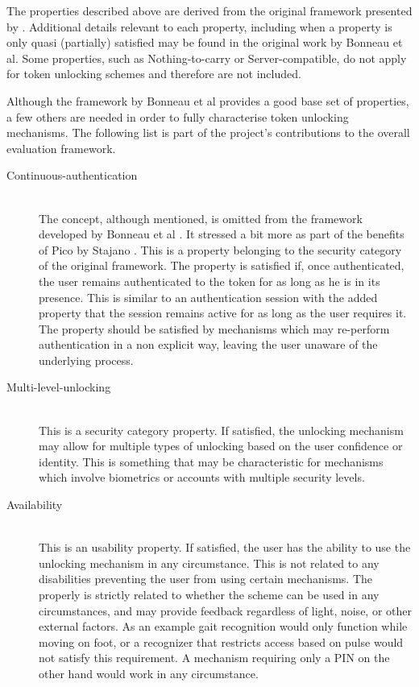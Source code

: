 The properties described above are derived from the original framework presented by \cite{bonneau2012quest}. Additional details relevant to each property, including when a property is only quasi (partially) satisfied may be found in the original work by Bonneau et al. Some properties, such as Nothing-to-carry or Server-compatible, do not apply for token unlocking schemes and therefore are not included.

Although the framework by Bonneau et al provides a good base set of properties, a few others are needed in order to fully characterise token unlocking mechanisms. The following list is part of the project's contributions to the overall evaluation framework.

\begin{description}
  \item[Continuous-authentication] \hfill \\
  The concept, although mentioned, is omitted from the framework developed by Bonneau et al \cite{bonneau2012quest}. It stressed a bit more as part of the benefits of Pico by Stajano \cite{stajano2011pico}. This is a property belonging to the security category of the original framework. The property is satisfied if, once authenticated, the user remains authenticated to the token for as long as he is in its presence. This is similar to an authentication session with the added property that the session remains active for as long as the user requires it. The property should be satisfied by mechanisms which may re-perform authentication in a non explicit way, leaving the user unaware of the underlying process.
  
  \item[Multi-level-unlocking] \hfill \\
  This is a security category property. If satisfied, the unlocking mechanism may allow for multiple types of unlocking based on the user confidence or identity. This is something that may be characteristic for mechanisms which involve biometrics or accounts with multiple security levels.
  
  \item[Availability] \hfill \\
  This is an usability property. If satisfied, the user has the ability to use the unlocking mechanism in any circumstance. This is not related to any disabilities preventing the user from using certain mechanisms. The properly is strictly related to whether the scheme can be used in any circumstances, and may provide feedback regardless of light, noise, or other external factors. As an example gait recognition would only function while moving on foot, or a recognizer that restricts access based on pulse would not satisfy this requirement. A mechanism requiring only a PIN on the other hand would work in any circumstance.
  
\end{description}

